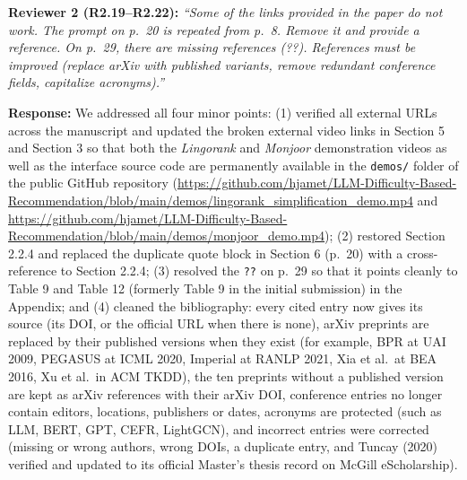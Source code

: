 \documentclass[11pt,a4paper]{article}
\newcommand{\mm}[1]{#1}
\newcommand{\mmhl}[1]{#1}
\begin{document}
\begin{reviewbox}
\textbf{Reviewer 2 (R2.19--R2.22):} \textit{``Some of the links provided in the paper do not work. The prompt on p.\ 20 is repeated from p.\ 8. Remove it and provide a reference. On p.\ 29, there are missing references (??). References must be improved (replace arXiv with published variants, remove redundant conference fields, capitalize acronyms).''}
\end{reviewbox}

\noindent\textbf{Response:}
\sloppy We addressed all four minor points: (1) verified all external URLs across the manuscript and updated the broken external video links in Section 5 and Section 3 so that both the \textit{Lingorank} and \textit{Monjoor} demonstration videos as well as the interface source code are permanently available in the \texttt{demos/} folder of the public GitHub repository (\url{https://github.com/hjamet/LLM-Difficulty-Based-Recommendation/blob/main/demos/lingorank_simplification_demo.mp4} and \url{https://github.com/hjamet/LLM-Difficulty-Based-Recommendation/blob/main/demos/monjoor_demo.mp4}); (2) restored Section 2.2.4 and replaced the duplicate quote block in Section 6 (p.\ 20) with a cross-reference to Section 2.2.4; (3) resolved the \texttt{??} on p.\ 29 so that it points cleanly to Table \mmhl{9} and Table \mmhl{12} (formerly Table 9 in the initial submission) in the Appendix; and (4) \mm{cleaned the bibliography: every cited entry now gives its source (its DOI, or the official URL when there is none), arXiv preprints are replaced by their published versions when they exist (for example, BPR at UAI 2009, PEGASUS at ICML 2020, Imperial at RANLP 2021, Xia et al.\ at BEA 2016, Xu et al.\ in ACM TKDD), the ten preprints without a published version are kept as arXiv references with their arXiv DOI, conference entries no longer contain editors, locations, publishers or dates, acronyms are protected (such as LLM, BERT, GPT, CEFR, LightGCN), and incorrect entries were corrected (missing or wrong authors, wrong DOIs, a duplicate entry, and Tuncay (2020) verified and updated to its official Master's thesis record on McGill eScholarship).}%
\end{document}
